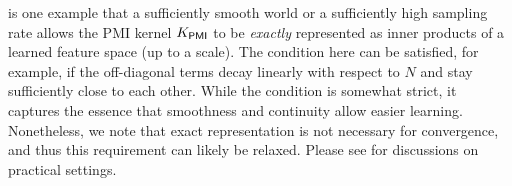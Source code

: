\begin{remark}
 is one example that a sufficiently smooth world or a sufficiently high sampling rate allows the PMI kernel $K_\mathsf{PMI}$ to be \emph{exactly} represented as inner products of a learned feature space (up to a scale). The condition here can be satisfied, for example, if the off-diagonal terms decay linearly with respect to $N$ and stay sufficiently close to each other. While the condition is somewhat strict, it 
captures the essence that smoothness and continuity allow easier learning. Nonetheless, we note that exact representation is not necessary for convergence, and thus this requirement can likely be relaxed.  Please see  for discussions on practical settings.
\end{remark}








